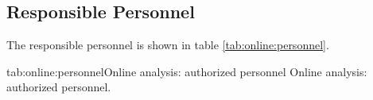\begin{safetyen}{10}{15}
\subsection{Responsible  Personnel} 
\end{safetyen}
The responsible personnel is shown in table \ref{tab:online:personnel}.
\begin{namestab}{tab:online:personnel}{Online analysis: authorized personnel}{%
      Online analysis: authorized personnel.}
  \RobertMichaels{}
\end{namestab}

%
%
%
%
%
%
%
%
